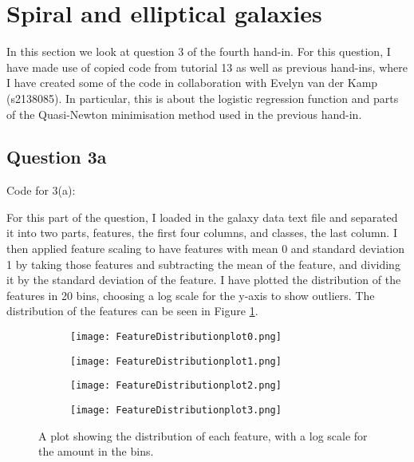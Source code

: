 \section{Spiral and elliptical galaxies}

In this section we look at question 3 of the fourth hand-in. 
For this question, I have made use of copied code from tutorial 13 as well as previous hand-ins, where I have created some of the code in collaboration with Evelyn van der Kamp (s2138085).
In particular, this is about the logistic regression function and parts of the Quasi-Newton minimisation method used in the previous hand-in.

\subsection{Question 3a}

Code for 3(a):


For this part of the question, I loaded in the galaxy data text file and separated it into two parts, features, the first four columns, and classes, the last column.
I then applied feature scaling to have features with mean 0 and standard deviation 1 by taking those features and subtracting the mean of the feature, and dividing it by the standard deviation of the feature.
I have plotted the distribution of the features in 20 bins, choosing a log scale for the y-axis to show outliers.
The distribution of the features can be seen in Figure \ref{fig:FD}.

\begin{figure}[ht!]
\begin{center}
        \begin{subfigure}{.49\textwidth}
      \centering
      \texttt{[image: FeatureDistributionplot0.png]}
    \end{subfigure}
    \vspace{-10pt}
    \begin{subfigure}{.49\textwidth}
      \centering
      \texttt{[image: FeatureDistributionplot1.png]}
    \end{subfigure}
     \vspace{-10pt}
    \begin{subfigure}{.49\textwidth}
      \centering
      \texttt{[image: FeatureDistributionplot2.png]}
    \end{subfigure}
     \vspace{-10pt}
    \begin{subfigure}{.49\textwidth}
      \centering
      \texttt{[image: FeatureDistributionplot3.png]}
    \end{subfigure}
    \caption{A plot showing the distribution of each feature, with a log scale for the amount in the bins.}
    \label{fig:FD}
\end{center}
\end{figure}


